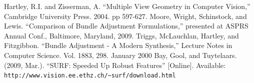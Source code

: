 \begin{thebibliography}{1}

 Hartley, R.I. and Zisserman, A. ``Multiple View Geometry in Computer Vision,''
  Cambridge University Press. 2004. pp 597-627.
 Moore, Wright, Schinstock, and Lewis. ``Comparison of Bundle Adjustment Formulations,''
  presented at ASPRS Annual Conf., Baltimore, Maryland, 2009.
 Triggs, McLauchlan, Hartley, and Fitzgibbon. ``Bundle Adjustment - A Modern Synthesis,''
  Lecture Notes in Computer Science. Vol. 1883, 298. January 2000
 Bay, Gool, and Tuytelaars. (2009, Mar.). ``SURF: Speeded Up Robust Features'' [Online]. Available: \verb!http://www.vision.ee.ethz.ch/~surf/download.html!

\end{thebibliography}
